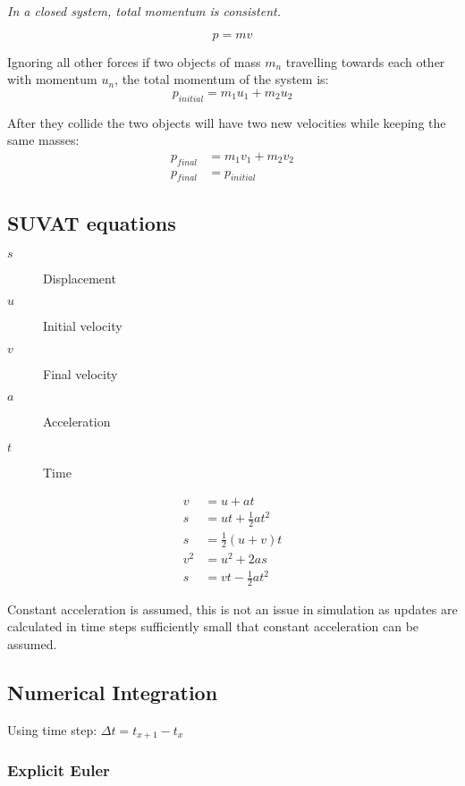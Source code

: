 \documentclass[a4paper]{article}
\begin{document}
\textit{In a closed system, total momentum is consistent.}

\[
  p = mv
\]

Ignoring all other forces if two objects of mass $m_{n}$ travelling towards each
other with momentum $u_{n}$, the total momentum of the system is:
\[
  p_{initial} = m_{1}u_{1} + m_{2}u_{2}
\]

After they collide the two objects will have two new velocities while keeping
the same masses:
\begin{align*}
  p_{final} &= m_{1}v_{1} + m_{2}v_{2} \\
  p_{final} &= p_{initial}
\end{align*}

\subsection{SUVAT equations}

\begin{description}
  \item[$s$] Displacement
  \item[$u$] Initial velocity
  \item[$v$] Final velocity
  \item[$a$] Acceleration
  \item[$t$] Time
\end{description}

\begin{align*}
      v &= u + at \\
      s &= ut + \frac{1}{2}at^{2} \\
      s &= \frac{1}{2} \left(u + v\right) t \\
  v^{2} &= u^{2} + 2as \\
      s &= vt - \frac{1}{2}at^{2}
\end{align*}

Constant acceleration is assumed, this is not an issue in simulation as updates
are calculated in time steps sufficiently small that constant acceleration can
be assumed.

\subsection{Numerical Integration}

Using time step: $\Delta t = t_{x + 1} - t_{x}$

\subsubsection{Explicit Euler}
\end{document}
